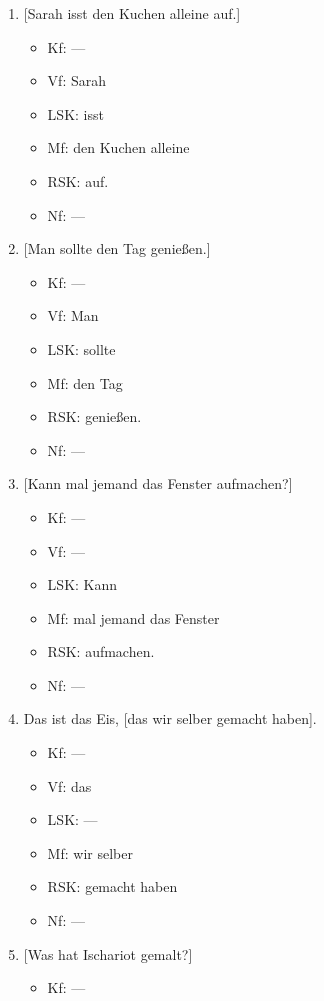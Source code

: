 \begin{enumerate}
  \item{} [Sarah isst den Kuchen alleine auf.]
    \begin{itemize}
      \item Kf: ---
      \item Vf: Sarah
      \item LSK: isst
      \item Mf: den Kuchen alleine
      \item RSK: auf.
      \item Nf: ---
    \end{itemize}
  \item{} [Man sollte den Tag genießen.]
    \begin{itemize}
      \item Kf: ---
      \item Vf: Man
      \item LSK: sollte
      \item Mf: den Tag
      \item RSK: genießen.
      \item Nf: ---
    \end{itemize}
  \item{} [Kann mal jemand das Fenster aufmachen?]
    \begin{itemize}
      \item Kf: ---
      \item Vf: ---
      \item LSK: Kann
      \item Mf: mal jemand das Fenster
      \item RSK: aufmachen.
      \item Nf: ---
    \end{itemize}
  \item Das ist das Eis, [das wir selber gemacht haben].
    \begin{itemize}
      \item Kf: ---
      \item Vf: das
      \item LSK: ---
      \item Mf: wir selber
      \item RSK: gemacht haben
      \item Nf: ---
    \end{itemize}
  \item{} [Was hat Ischariot gemalt?]
    \begin{itemize}
      \item Kf: ---

\end{itemize}
\end{enumerate}
